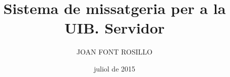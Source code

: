 \documentclass[catalan,GINF]{TFGEPSUIB}
\title{Sistema de missatgeria per a la UIB. Servidor}
\author{\MakeUppercase{Joan Font Rosillo}}
\date{juliol de 2015}
\begin{document}
\portada
\frontmatter

\cleartorecto \thispagestyle{empty}
\begin{agraiments}

\end{agraiments}

\cleartorecto \tableofcontents
\cleartorecto \listoffigures
\cleartorecto \listoftables 

 

 
\mainmatter\pagestyle{ruled}







\appendix 




\backmatter



 
\end{document}
